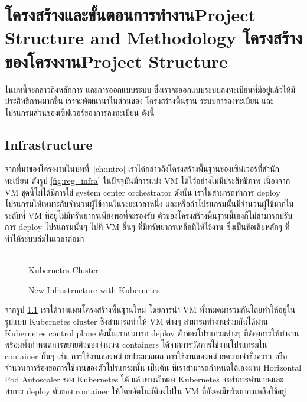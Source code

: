 \chapter{\ifproject%
\ifcpe โครงสร้างและขั้นตอนการทำงาน\else Project Structure and Methodology\fi
\else%
\ifcpe โครงสร้างของโครงงาน\else Project Structure\fi
\fi
}
\label{ch:approach}

ในบทนี้จะกล่าวถึงหลักการ และการออกแบบระบบ ซึ่งเราจะออกแบบระบบลงทะเบียนที่มีอยู่แล้วให้มีประสิทธิภาพมากขึ้น เราจะพัฒนานาในส่วนของ โครงสร้างพื้นฐาน ระบบการลงทะเบียน และ โปรแกรมส่วนของเซิฟเวอร์ของการลงทะเบียน ดังนี้

\makeatletter

\section {Infrastructure}
\label{sec:infra}

จากที่มาของโครงงานในบทที่~\ref{ch:intro} เราได้กล่าวถึงโครงสร้างพื้นฐานของเซิฟเวอร์ที่สำนักทะเบียน ดังรูป \ref{fig:reg_infra} ในปัจจุบันมีการแบ่ง VM \cite{vm} ได้ไว้อย่างไม่มีประสิทธิภาพ เนื่องจาก VM ชุดนี้ไม่ได้มีการใช้ system center orchestrator \cite{sco} ดังนั้น เราไม่สามารถทำการ deploy โปรแกรมให้เหมาะกับจำนวนผู้ใช้งานในระยะเวลาหนึ่ง และหรือถ้าโปรแกรมนั้นมีจำนวนผู้ใช้มากในระดับที่ VM ที่อยู่ไม่มีทรัพยากรเพืยงพอที่จะรองรับ ตัวของโครงสร้างพื้นฐานนี้เองก็ไม่สามารถปรับการ deploy โปรแกรมนั้นๆ ไปที่ VM อื่นๆ ที่มีทรัพยากรเหลือที่ให้ใช้งาน ซึ่งเป็นข้อเสียหลักๆ ที่ทำให้ระบบล่มในเวลาต่อมา

\begin{figure}
    \centering
    \begin{center}
     \\
    Kubernetes Cluster
    \end{center}
    \caption[Poem]{New Infrastructure with Kubernetes}
    \label{fig:new_infra}
\end{figure}

จากรูป \ref{fig:new_infra} เราได้วางแผนโครงสร้างพื้นฐานใหม่ โดยการนำ VM ทั้งหมดมารวมกันโดยทำให้อยู่ในรูปแบบ Kubernetes cluster ซึ่งสามารถทำให้ VM ต่างๆ สามารถทำงานร่วมกันได้ผ่าน Kubernetes control plane \cite{kubecomp} ดังนั้นเราสามารถ deploy ตัวของโปรแกรมต่างๆ ที่ต้องการให้ทำงาน พร้อมทั้งกำหนดการขยายตัวของจำนวน containers ได้จากการวัดการใช้งานโปรแกรมใน container นั้นๆ เช่น การใช้งานของหน่วยประมวลผล การใช้งานของหน่วยความจำชั่วคราว หรือจำนวนการร้องขอการใช้งานของตัวโปรแกรมนั้น เป็นต้น ที่เราสามารถกำหนดได้เองผ่าน Horizontal Pod Autoscaler \cite{kubehpa} ของ Kubernetes ได้ แล้วทางตัวของ Kubernetes จะทำการคำนวณและทำการ deploy ตัวของ container ให้โดยอัตโนมัติลงไปใน VM ที่ยังคงมีทรัพยากรเหลือใช้อยู่

